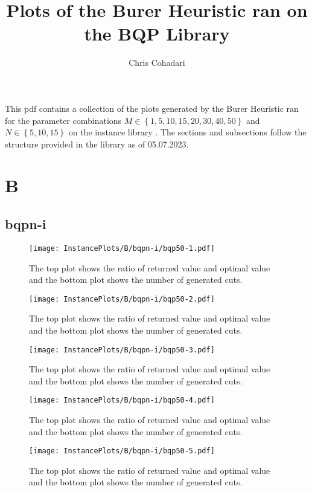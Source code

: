 \documentclass[10pt,a4paper]{article}
\title{Plots of the Burer Heuristic ran on the BQP Library}\author{Chris Cohadari}
\begin{document}
\maketitle
This pdf contains a collection of the plots generated by the Burer Heuristic ran for the parameter         combinations $ M \in \left\{ 1, 5, 10, 15, 20, 30, 40, 50 \right\}  $ and $ N \in \left\{ 5, 10, 15 \right\}  $ on the instance library \cite{MallachLibrary}.
The sections and subsections follow the structure provided in the library as of 05.07.2023.



\tableofcontents
\section{B}
\subsection{bqpn-i}
\begin{figure}[H]
\texttt{[image: InstancePlots/B/bqpn-i/bqp50-1.pdf]}
\caption{The top plot shows the ratio of returned value and optimal value     and the bottom plot shows the number of generated cuts.}
\end{figure}

\begin{figure}[H]
\texttt{[image: InstancePlots/B/bqpn-i/bqp50-2.pdf]}
\caption{The top plot shows the ratio of returned value and optimal value     and the bottom plot shows the number of generated cuts.}
\end{figure}

\begin{figure}[H]
\texttt{[image: InstancePlots/B/bqpn-i/bqp50-3.pdf]}
\caption{The top plot shows the ratio of returned value and optimal value     and the bottom plot shows the number of generated cuts.}
\end{figure}

\begin{figure}[H]
\texttt{[image: InstancePlots/B/bqpn-i/bqp50-4.pdf]}
\caption{The top plot shows the ratio of returned value and optimal value     and the bottom plot shows the number of generated cuts.}
\end{figure}

\begin{figure}[H]
\texttt{[image: InstancePlots/B/bqpn-i/bqp50-5.pdf]}
\caption{The top plot shows the ratio of returned value and optimal value     and the bottom plot shows the number of generated cuts.}
\end{figure}
\end{document}
